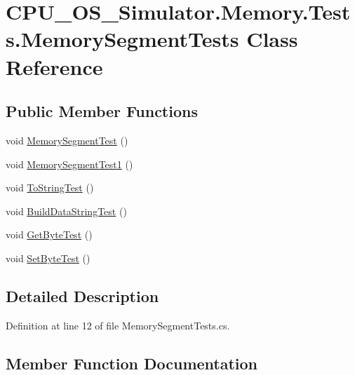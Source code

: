 \hypertarget{class_c_p_u___o_s___simulator_1_1_memory_1_1_tests_1_1_memory_segment_tests}{}\section{C\+P\+U\+\_\+\+O\+S\+\_\+\+Simulator.\+Memory.\+Tests.\+Memory\+Segment\+Tests Class Reference}
\label{class_c_p_u___o_s___simulator_1_1_memory_1_1_tests_1_1_memory_segment_tests}
\subsection*{Public Member Functions}
\begin{DoxyCompactItemize}
\item 
void \hyperlink{class_c_p_u___o_s___simulator_1_1_memory_1_1_tests_1_1_memory_segment_tests_a82762effc0343c94b33bc489750c956b}{Memory\+Segment\+Test} ()
\item 
void \hyperlink{class_c_p_u___o_s___simulator_1_1_memory_1_1_tests_1_1_memory_segment_tests_a807a686c73e7f114a38ae2432bdd184a}{Memory\+Segment\+Test1} ()
\item 
void \hyperlink{class_c_p_u___o_s___simulator_1_1_memory_1_1_tests_1_1_memory_segment_tests_a1b749eaa20c05ec75cd61186d5080887}{To\+String\+Test} ()
\item 
void \hyperlink{class_c_p_u___o_s___simulator_1_1_memory_1_1_tests_1_1_memory_segment_tests_ab7c12761921a7c9a43f633e7fa21224d}{Build\+Data\+String\+Test} ()
\item 
void \hyperlink{class_c_p_u___o_s___simulator_1_1_memory_1_1_tests_1_1_memory_segment_tests_a2228f143209fcd8a43e568f8a35166a8}{Get\+Byte\+Test} ()
\item 
void \hyperlink{class_c_p_u___o_s___simulator_1_1_memory_1_1_tests_1_1_memory_segment_tests_a26b873fdb5bfdf23ce87ee7fbedcfba9}{Set\+Byte\+Test} ()
\end{DoxyCompactItemize}


\subsection{Detailed Description}


Definition at line 12 of file Memory\+Segment\+Tests.\+cs.



\subsection{Member Function Documentation}
\hypertarget{class_c_p_u___o_s___simulator_1_1_memory_1_1_tests_1_1_memory_segment_tests_ab7c12761921a7c9a43f633e7fa21224d}{}
